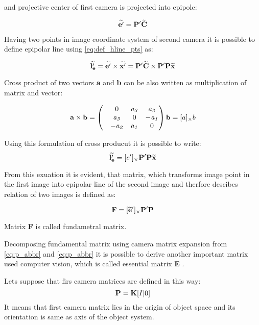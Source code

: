 \documentclass[a4paper,12pt]{report}
\newcommand{\ematr}[1]{
{\bf #1}
}
\newcommand{\evect}[1]{
{\bf #1}
}
\newcommand{\ehvect}[1]{
{\bf \widetilde{#1}}
}
\newcommand{\escal}[1]{
{\it #1}
}
\begin{document}
and projective center of first camera is projected into epipole: 

\begin{equation}
\ehvect{e'} =  \ematr{P'}\ehvect{C}
\end{equation}

Having two points in image coordinate system of second camera it is possible to define epipolar line using \eqref{eq:def_hline_pts} as:

\begin{equation}
\ehvect{l'_{e}} =  \ehvect{e'} \times \ehvect{x'} = \ematr{P'}\ehvect{C} \times \ematr{P'}\ematr{P}\ehvect{x}
\end{equation}

Cross product of two vectors \evect{a} and \evect{b} can be also written as multiplication of matrix and vector:

\begin{equation}
\evect{a}  \times \evect{b}  = 
\begin{pmatrix}
   & 0      & \escal{a_{3}}   & \escal{a_{2}}\\
   & \escal{a_{3}}  & 0               & \escal{-a_{1}}\\
   & \escal{-a_{2}} & \escal{a_{1}}   & 0\\
\end{pmatrix}
\evect{b} = [a]_{\times} b
\end{equation}

Using this formulation of cross producut it is possible to write:
\begin{equation}
\ehvect{l'_{e}}  = [e']_{\times} \ematr{P'}\ematr{P}\ehvect{x}
\end{equation}

From this exuation it is evident, that matrix, which transforms image point in the first image into 
epipolar line of the second image and therfore descibes relation of two images is defined as:

\begin{equation}
\ematr{F}  = [\ehvect{e}']_{\times} \ematr{P'}\ematr{P}
\end{equation}

Matrix \ematr{F} is called fundametral matrix. 

Decomposing fundamental matrix using camera matrix expansion from \eqref{eq:p_abbr} and \eqref{eq:p_abbr}
it is possible to derive another important matrix used computer vision, which is called essential matrix \ematr{E}.

Lets suppose that firs camera matrices are defined in this way:
\begin{equation}
\label{eq:rel_or_cam1}
\ematr{P}  = \ematr{K} \ematr{[}I|0\ematr{]}
\end{equation}
It means that first camera matrix lies in the origin of object space and its orientation is same
as axis of the object system.
\end{document}
